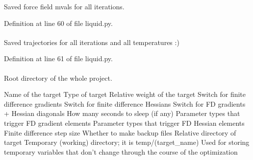 \-Saved force field mvals for all iterations. 



\-Definition at line 60 of file liquid.\-py.

\hypertarget{classforcebalance_1_1liquid_1_1Liquid_acab3a497d408af6d152a460ecba40583}{
\paragraph[{\-Saved\-Traj}]{}}\label{classforcebalance_1_1liquid_1_1Liquid_acab3a497d408af6d152a460ecba40583}


\-Saved trajectories for all iterations and all temperatures \-:) 



\-Definition at line 61 of file liquid.\-py.

\hypertarget{classforcebalance_1_1target_1_1Target_aede2856573b890cd47054ad36937d6f6}{
\paragraph[{tempdir}]{}}\label{classforcebalance_1_1target_1_1Target_aede2856573b890cd47054ad36937d6f6}


\-Root directory of the whole project. 

\-Name of the target \-Type of target \-Relative weight of the target \-Switch for finite difference gradients \-Switch for finite difference \-Hessians \-Switch for \-F\-D gradients + \-Hessian diagonals \-How many seconds to sleep (if any) \-Parameter types that trigger \-F\-D gradient elements \-Parameter types that trigger \-F\-D \-Hessian elements \-Finite difference step size \-Whether to make backup files \-Relative directory of target \-Temporary (working) directory; it is temp/(target\-\_\-name) \-Used for storing temporary variables that don't change through the course of the optimization 

